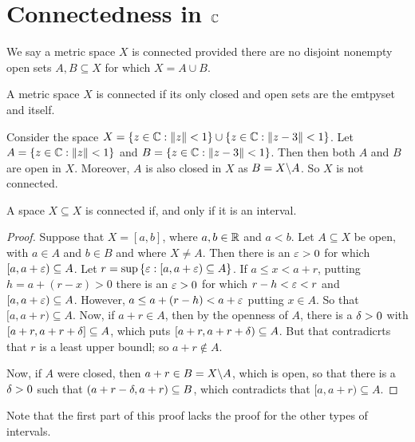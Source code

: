 \section{Connectedness in $\mathbb{C}$}

\begin{definition}
    We say a metric space $X$ is connected provided there are no disjoint
    nonempty open sets  $A,B \subseteq X$ for which  $X=A \cup B$.
\end{definition}

\begin{lemma}\label{2.2.1}
    A metric space $X$ is connected if its only closed and open sets are the
    emtpyset and itself.
\end{lemma}

\begin{example}\label{example_2.5}
    Consider the space $X=\{z \in \mathbb{C} : \|z\|<1\} \cup \{z \in \mathbb{C} : \|z-3\|<1\}$.
    Let $A=\{z \in \mathbb{C} : \|z\|<1\}$ and $B=\{z \in \mathbb{C} : \|z-3\|<1\}$. Then then
    both $A$ and $B$ are open in  $X$. Moreover,  $A$ is also closed in $X$ as
    $B=X \backslash A$. So $X$ is not connected.
\end{example}

\begin{lemma}\label{2.2.2}
    A space $X \subseteq X$ is connected if, and only if it is an interval.
\end{lemma}
\begin{proof}
    Suppose that $X=[a,b]$, where $a,b \in \mathbb{R}$ and  $a<b$. Let  $A \subseteq X$
    be open, with  $a \in A$ and  $b \in B$ and where $X \neq A$. Then there is
    an $\varepsilon>0$ for which  $[a,a+\varepsilon) \subseteq A$. Let $r=\sup{\{\varepsilon: [a,a+\varepsilon)
    \subseteq A\}}$. If $a \leq x <a+r$, putting  $h=a+(r-x)>0$ there is an $\varepsilon
    > 0$ for which  $r-h<\varepsilon<r$ and $[a,a+\varepsilon) \subseteq A$. However, $a \leq
    a+(r-h)<a+\varepsilon$ putting $x \in A$. So that  $[a,a+r) \subseteq A$. Now, if
    $a+r \in A$, then by the openness of  $A$, there is a  $\delta>0$ with
    $[a+r,a+r+\delta] \subseteq A$, which puts $[a+r,a+r+\delta) \subseteq A$. But that
    contradicrts that $r$ is a least upper boundl; so $a+r \notin A$.

    Now, if $A$ were closed, then  $a+r \in B=X \backslash A$, which is open, so
    that there is a $\delta>0$ such that  $(a+r-\delta,a+r) \subseteq B$, which
    contradicts that $[a,a+r) \subseteq A$.
\end{proof}
\begin{remark}
    Note that the first part of this proof lacks the proof for the other types
    of intervals.
\end{remark}


